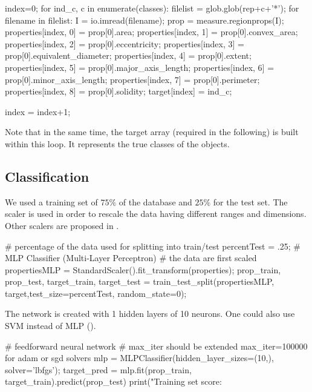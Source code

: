\begin{python}
index=0;
for ind_c, c in enumerate(classes):
    filelist = glob.glob(rep+c+'*');
    for filename in filelist:
        I = io.imread(filename);
        prop = measure.regionprops(I);
        properties[index, 0] = prop[0].area;
        properties[index, 1] = prop[0].convex_area;
        properties[index, 2] = prop[0].eccentricity;
        properties[index, 3] = prop[0].equivalent_diameter;
        properties[index, 4] = prop[0].extent;
        properties[index, 5] = prop[0].major_axis_length;
        properties[index, 6] = prop[0].minor_axis_length;
        properties[index, 7] = prop[0].perimeter;
        properties[index, 8] = prop[0].solidity;
        target[index] = ind_c;
        
        index = index+1;
\end{python}

Note that in the same time, the target array (required in the following) is built within this loop. It represents the true classes of the objects.

\vspace*{-6pt}

\subsection{Classification}
We used a training set of $75\%$ of the database and $25\%$ for the test set. The scaler is used in order to rescale the data having different ranges and dimensions. Other scalers are proposed in .

\begin{python}
# percentage of the data used for splitting into train/test
percentTest = .25;
# MLP Classifier (Multi-Layer Perceptron)
# the data are first scaled
propertiesMLP = StandardScaler().fit_transform(properties);
prop_train, prop_test, target_train, target_test = train_test_split(propertiesMLP, target,test_size=percentTest, random_state=0);
\end{python}

\vspace*{-2pt}

The network is created with 1 hidden layers of 10 neurons. One could also use SVM instead of MLP ().

\begin{python}
# feedforward neural network
# max_iter should be extended max_iter=100000 for adam or sgd solvers
mlp = MLPClassifier(hidden_layer_sizes=(10,), solver='lbfgs');
target_pred = mlp.fit(prop_train, target_train).predict(prop_test)
print("Training set score: %
\end{python}

